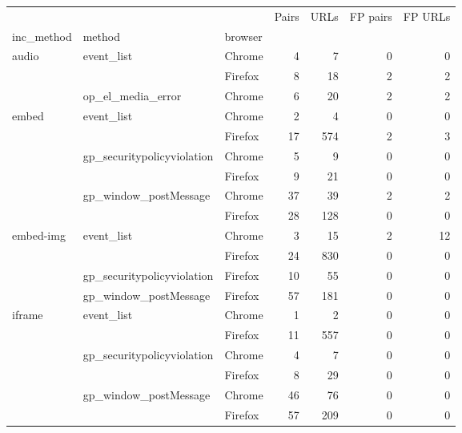 \begin{tabular}{lllrrrr}
\toprule
            &               &         &  Pairs &  URLs &  FP pairs &  FP URLs \\
inc\_method & method & browser &        &       &           &          \\
\midrule
audio & event\_list & Chrome &      4 &     7 &         0 &        0 \\
            &               & Firefox &      8 &    18 &         2 &        2 \\
            & op\_el\_media\_error & Chrome &      6 &    20 &         2 &        2 \\
embed & event\_list & Chrome &      2 &     4 &         0 &        0 \\
            &               & Firefox &     17 &   574 &         2 &        3 \\
            & gp\_securitypolicyviolation & Chrome &      5 &     9 &         0 &        0 \\
            &               & Firefox &      9 &    21 &         0 &        0 \\
            & gp\_window\_postMessage & Chrome &     37 &    39 &         2 &        2 \\
            &               & Firefox &     28 &   128 &         0 &        0 \\
embed-img & event\_list & Chrome &      3 &    15 &         2 &       12 \\
            &               & Firefox &     24 &   830 &         0 &        0 \\
            & gp\_securitypolicyviolation & Firefox &     10 &    55 &         0 &        0 \\
            & gp\_window\_postMessage & Firefox &     57 &   181 &         0 &        0 \\
iframe & event\_list & Chrome &      1 &     2 &         0 &        0 \\
            &               & Firefox &     11 &   557 &         0 &        0 \\
            & gp\_securitypolicyviolation & Chrome &      4 &     7 &         0 &        0 \\
            &               & Firefox &      8 &    29 &         0 &        0 \\
            & gp\_window\_postMessage & Chrome &     46 &    76 &         0 &        0 \\
            &               & Firefox &     57 &   209 &         0 &        0 \\

\end{tabular}
